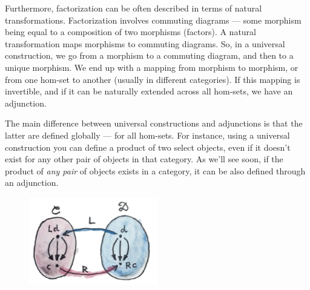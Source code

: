 Furthermore, factorization can be often described in terms of natural
transformations. Factorization involves commuting diagrams --- some
morphism being equal to a composition of two morphisms (factors). A
natural transformation maps morphisms to commuting diagrams. So, in a
universal construction, we go from a morphism to a commuting diagram,
and then to a unique morphism. We end up with a mapping from morphism to
morphism, or from one hom-set to another (usually in different
categories). If this mapping is invertible, and if it can be naturally
extended across all hom-sets, we have an adjunction.

The main difference between universal constructions and adjunctions is
that the latter are defined globally --- for all hom-sets. For instance,
using a universal construction you can define a product of two select
objects, even if it doesn't exist for any other pair of objects in that
category. As we'll see soon, if the product of \emph{any pair} of
objects exists in a category, it can be also defined through an
adjunction.

\begin{figure}[H]
  \centering
  \includegraphics[width=0.5\textwidth]{images/adj-homsets.jpg}
\end{figure}

